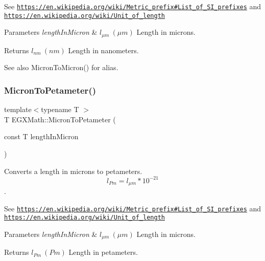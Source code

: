 See \href{https://en.wikipedia.org/wiki/Metric_prefix#List_of_SI_prefixes}{\tt https\+://en.\+wikipedia.\+org/wiki/\+Metric\+\_\+prefix\#\+List\+\_\+of\+\_\+\+S\+I\+\_\+prefixes} and \href{https://en.wikipedia.org/wiki/Unit_of_length}{\tt https\+://en.\+wikipedia.\+org/wiki/\+Unit\+\_\+of\+\_\+length} 
\begin{DoxyParams}{Parameters}
{\em length\+In\+Micron} & $ l_{\mu m}\ (\mu m)$ Length in microns. \\
\hline
\end{DoxyParams}
\begin{DoxyReturn}{Returns}
$ l_{nm}\ (nm)$ Length in nanometers. 
\end{DoxyReturn}
\begin{DoxySeeAlso}{See also}
Micron\+To\+Micron() for alias. 
\end{DoxySeeAlso}
\mbox{\label{group___e_g_x_math-_conversions-_length_conversions-_non-_s_i-_micron-_s_i_ga2260fe792831ea80f1d61c3b876d1f11}} 
\subsubsection{\texorpdfstring{Micron\+To\+Petameter()}{MicronToPetameter()}}
{\footnotesize\ttfamily template$<$typename T $>$ \\
T E\+G\+X\+Math\+::\+Micron\+To\+Petameter (\begin{DoxyParamCaption}\item[{const T}]{length\+In\+Micron }\end{DoxyParamCaption})}



Converts a length in microns to petameters. \[ l_{Pm}=l_{\mu m} * 10^{-21} \]. 

See \href{https://en.wikipedia.org/wiki/Metric_prefix#List_of_SI_prefixes}{\tt https\+://en.\+wikipedia.\+org/wiki/\+Metric\+\_\+prefix\#\+List\+\_\+of\+\_\+\+S\+I\+\_\+prefixes} and \href{https://en.wikipedia.org/wiki/Unit_of_length}{\tt https\+://en.\+wikipedia.\+org/wiki/\+Unit\+\_\+of\+\_\+length} 
\begin{DoxyParams}{Parameters}
{\em length\+In\+Micron} & $ l_{\mu m}\ (\mu m)$ Length in microns. \\
\hline
\end{DoxyParams}
\begin{DoxyReturn}{Returns}
$ l_{Pm}\ (Pm)$ Length in petameters. 
\end{DoxyReturn}
\mbox{\label{group___e_g_x_math-_conversions-_length_conversions-_non-_s_i-_micron-_s_i_ga6e091e653fd9efb8769cc131fcbc41bc}} 
